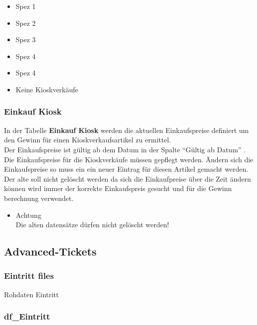 \documentclass[
]{article}
\providecommand{\tightlist}{%
  \setlength{\itemsep}{0pt}\setlength{\parskip}{0pt}}
\begin{document}
\begin{itemize}
\tightlist
\item
  Spez 1
\item
  Spez 2
\item
  Spez 3
\item
  Spez 4
\item
  Spez 4
\item
  Keine Kioskverkäufe
\end{itemize}

\subsubsection{Einkauf Kiosk}\label{einkauf-kiosk}

In der Tabelle \textbf{Einkauf Kiosk} werden die aktuellen
Einkaufspreise definiert um den Gewinn für einen Kioskverkaufsartikel zu
ermittel.\\
Der Einkaufspreise ist gültig ab dem Datum in der Spalte ``Gültig ab
Datum'' .\\
Die Einkaufspreise für die Kioskverkäufe müssen gepflegt werden. Ändern
sich die Einkaufspreise so muss ein ein neuer Eintrag für diesen Artikel
gemacht werden. Der alte soll nicht gelöscht werden da sich die
Einkaufpreise über die Zeit ändern können wird immer der korrekte
Einkaufspreis gesucht und für die Gewinn berechnung verwendet.\\

\begin{itemize}
\tightlist
\item
  Achtung\\
  Die alten datensätze dürfen nicht gelöscht werden!
\end{itemize}

\subsection{Advanced-Tickets}\label{advanced-tickets}

\subsubsection{Eintritt files}\label{eintritt-files}

Rohdaten Eintritt

\subsubsection{df\_Eintritt}\label{df_eintritt}
\end{document}
